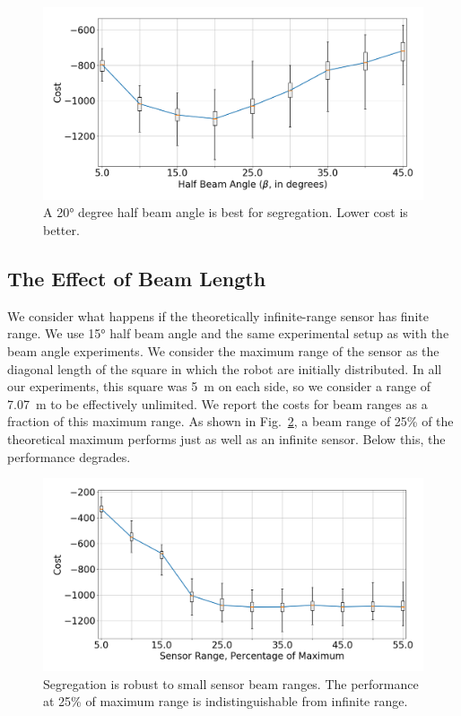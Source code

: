 \documentclass[letterpaper, 10 pt, conference]{ieeeconf}
\begin{document}
\begin{figure}[t]
  \centering
  \includegraphics[width=0.9\linewidth]{./images/beam_angle}
  \caption{A \ang{20} degree half beam angle is best for segregation. Lower cost
    is better.}
  \label{fig:beam_angle}
\end{figure}

\subsection{The Effect of Beam Length} \label{section:beam_range}

We consider what happens if the theoretically infinite-range sensor has finite
range. We use \ang{15} half beam angle and the same experimental setup as with
the beam angle experiments. We consider the maximum range of the sensor as the
diagonal length of the square in which the robot are initially distributed. In
all our experiments, this square was \SI{5}{\meter} on each side, so we consider
a range of \SI{7.07}{\meter} to be effectively unlimited. We report the costs
for beam ranges as a fraction of this maximum range. As shown in
Fig.~\ref{fig:beam_range}, a beam range of 25\% of the theoretical maximum
performs just as well as an infinite sensor. Below this, the performance
degrades.

\begin{figure}[t]
  \centering
  \includegraphics[width=0.9\linewidth]{./images/beam_length}
  \caption{Segregation is robust to small sensor beam ranges. The performance at
    25\% of maximum range is indistinguishable from infinite range.}
  \label{fig:beam_range}
\end{figure}
\end{document}
